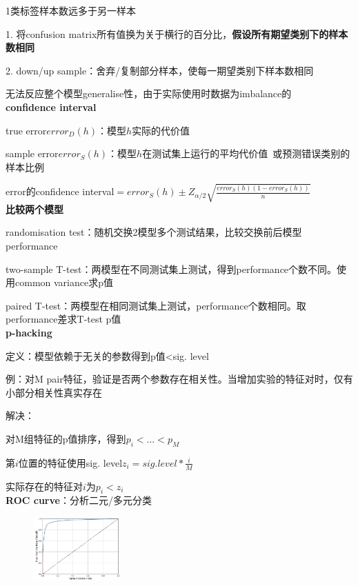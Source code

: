 \documentclass[UTF8]{ctexart}
\begin{document}
  1类标签样本数远多于另一样本
  
  1. 将confusion matrix所有值换为关于横行的百分比，\textbf{假设所有期望类别下的样本数相同}
  
  2. down/up sample：舍弃/复制部分样本，使每一期望类别下样本数相同
  
  \quad 无法反应整个模型generalise性，由于实际使用时数据为imbalance的\\
\textbf{confidence interval}

  true error$error_D(h)$：模型$h$实际的代价值

  sample error$error_S(h)$：模型$h$在测试集上运行的平均代价值\ 或预测错误类别的样本比例

  error的confidence interval$= error_S(h) \pm Z_{\alpha/2}\sqrt{\frac{error_S(h)(1-error_S(h))}{n}}$\\
\textbf{比较两个模型}

  randomisation test：随机交换2模型多个测试结果，比较交换前后模型performance

  two-sample T-test：两模型在不同测试集上测试，得到performance个数不同。使用common variance求p值

  paired T-test：两模型在相同测试集上测试，performance个数相同。取performance差求T-test p值\\
\textbf{p-hacking}

  定义：模型依赖于无关的参数得到p值<sig. level

  \quad 例：对M pair特征，验证是否两个参数存在相关性。当增加实验的特征对时，仅有小部分相关性真实存在

  解决：
  
  \quad 对M组特征的p值排序，得到$p_i < ...< p_M$

  \quad 第$i$位置的特征使用sig. level$z_i = sig. level * \frac{i}{M}$ 

  \quad 实际存在的特征对$i$为$p_i < z_i$\\
\textbf{ROC curve}：分析二元/多元分类

  \begin{figure}[H] %
    \centering %
    \includegraphics[width=0.3\textwidth]{note_images/ROC_curve.png} %
  \end{figure}
\end{document}
